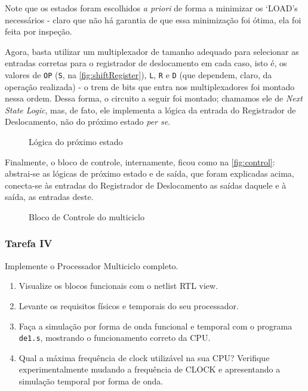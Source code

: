 \documentclass[a4paper,12pt]{article}
\newcommand{\cod}[1]{\texttt{#1}}
\begin{document}
\noindent Note que os estados foram escolhidos \textit{a priori} de forma a minimizar os `LOAD's necessários - claro que não há garantia de que essa minimização foi ótima, ela foi feita por inspeção.

Agora, basta utilizar um multiplexador de tamanho adequado para selecionar as entradas corretas para o registrador de deslocamento em cada caso, isto é, os valores de \cod{OP} (\cod{S}, na \autoref{fig:shiftRegister}), \cod{L}, \cod{R} e \cod{D} (que dependem, claro, da operação realizada) - o trem de bits que entra nos multiplexadores foi montado nessa ordem. Dessa forma, o circuito a seguir foi montado; chamamos ele de \textit{Next State Logic}, mas, de fato, ele implementa a lógica da entrada do Registrador de Deslocamento, não do próximo estado \textit{per se}.

\begin{figure}[H]
    \centering
    
    \vspace{-30pt}
    \caption{Lógica do próximo estado}
\end{figure}

Finalmente, o bloco de controle, internamente, ficou como na \autoref{fig:control}: abstrai-se as lógicas de próximo estado e de saída, que foram explicadas acima, conecta-se às entradas do Registrador de Deslocamento as saídas daquele e à saída, as entradas deste.

\begin{figure}[H]
    
    \vspace{-20pt}
    \caption{Bloco de Controle do multiciclo}
    \label{fig:control}
\end{figure}

\subsubsection{Tarefa IV}
\begin{tcolorbox}[title=Enunciado, colback=blue!5!white, colframe=blue!75!black]
Implemente o Processador Multiciclo completo.
\begin{enumerate}[label=(\alph*)]
    \item Visualize os blocos funcionais com o netlist RTL view.
    \item Levante os requisitos físicos e temporais do seu processador.
    \item Faça a simulação por forma de onda funcional e temporal com o programa \cod{de1.s}, mostrando o funcionamento correto da CPU. 
    \item Qual a máxima frequência de clock utilizável na sua CPU? Verifique experimentalmente mudando a frequência de CLOCK e apresentando a simulação temporal por forma de onda. 
\end{enumerate}
\end{tcolorbox}
\end{document}
